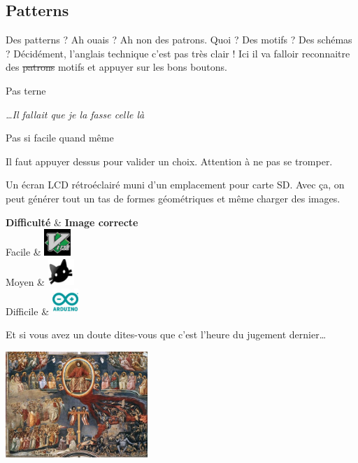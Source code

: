 \subsection{Patterns}
Des patterns ? Ah ouais ? Ah non des patrons. Quoi ? Des motifs ? Des schémas ?
Décidément, l'anglais technique c'est pas très clair ! Ici il va falloir
reconnaitre des \sout{patrons} motifs et appuyer sur les bons boutons.
\begin{modulebox}{Pas terne}
  \begin{hangingpar}
    \begin{flushright}
    \textit{\dots Il fallait que je la fasse celle là}
    \end{flushright}
  \end{hangingpar}
  \begin{moduleaction}[Difficulté]
    Pas si facile quand même
  \end{moduleaction}
  \hline%
  \begin{moduleaction}[boutons]
    Il faut appuyer dessus pour valider un choix. Attention à ne pas se tromper.
  \end{moduleaction}
  \begin{moduleaction}
    Un écran LCD rétroéclairé muni d'un emplacement pour carte SD. Avec ça, on
    peut générer tout un tas de formes géométriques et même charger des images.
  \end{moduleaction}
\end{modulebox}
\begin{dndtable}
	\textbf{Difficulté} & \textbf{Image correcte} \\
	Facile & \qquad\includegraphics[height=1cm]{img/vim.jpg} \\
	Moyen & \qquad\includegraphics[height=1cm]{img/cat.jpg} \\
	Difficile & \qquad\includegraphics[height=1cm]{img/logo.jpg} \\
\end{dndtable}

\noindent Et si vous avez un doute dites-vous que c'est l'heure du jugement dernier\ldots
\newline
\vspace{0.5cm}
\centerline{\includegraphics[height=4cm]{img/jugement-dernier.jpg}}
\newpage
